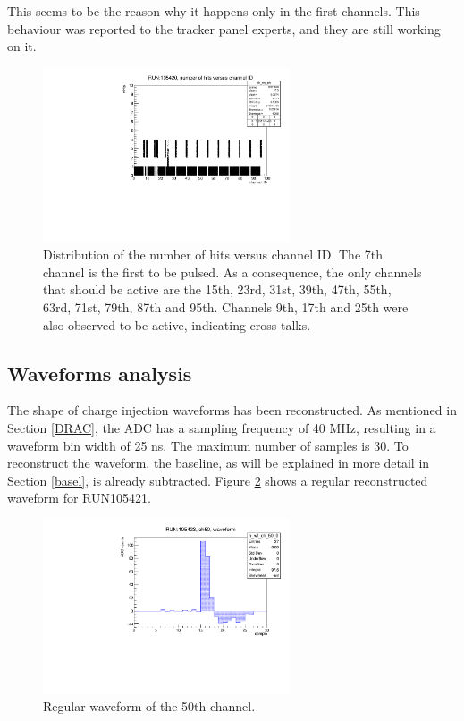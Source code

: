 This seems to be the reason why it happens only in the first channels. This behaviour was reported to the tracker panel experts, and they are still working on it.
\begin{figure}[!h]
  \centering
  \includegraphics[width=0.65\textwidth]{figures/pdf/run105420_nh_vs_ch.pdf}
  \caption{Distribution of the number of hits versus channel ID. The 7th channel is the first to be pulsed. 
  As a consequence, the only channels that should be active are the 15th, 23rd, 31st, 39th, 47th, 55th, 63rd, 71st, 79th, 87th and 95th. 
  Channels 9th, 17th and 25th were also observed to be active, indicating cross talks.}
 \label{fig:cross}
\end{figure}
\subsection{Waveforms analysis}\label{wf}
The shape of charge injection waveforms has been reconstructed. As mentioned in Section \ref{DRAC}, 
the ADC has a sampling frequency of 40 MHz, resulting in a waveform bin width of 25 ns. 
The maximum number of samples is 30. To reconstruct the waveform, the baseline, as will be 
explained in more detail in Section \ref{basel}, is already subtracted.
Figure \ref{fig:normalwf} shows a regular reconstructed waveform for RUN105421.
\begin{figure}[!h]
  \centering
  \includegraphics[width=0.65\textwidth]{figures/pdf/wf_ch50_0.pdf}
  \caption{Regular waveform of the 50th channel.}
 \label{fig:normalwf}
\end{figure}

